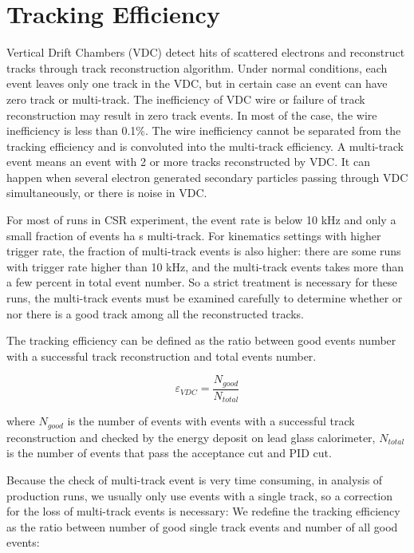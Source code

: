 \section{Tracking Efficiency}

Vertical Drift Chambers (VDC) detect hits of scattered electrons and reconstruct tracks through track
reconstruction algorithm.
Under normal conditions, each event leaves only one track in the VDC, but in certain case an event
can have zero track or multi-track.
The inefficiency of VDC wire or failure of track reconstruction may result in zero track events.
In most of the case, the wire inefficiency is less than 0.1\%.
The wire inefficiency cannot be separated from the tracking efficiency and is convoluted into 
the multi-track efficiency.
A multi-track event means an event  with 2 or more tracks reconstructed by VDC.
It can happen when several electron generated secondary particles passing through VDC simultaneously,
or there is noise in VDC.

For most of runs in CSR experiment, the event rate is below 10 kHz and only a small fraction of events ha
s multi-track. For kinematics settings with higher trigger rate, the fraction of multi-track events is also
higher: there are some runs with trigger rate higher than 10 kHz, and the multi-track events
takes more than a few percent in total event number. So a strict treatment is necessary for these runs,
the multi-track events must be examined carefully to determine whether or nor there is a good track among all
the reconstructed tracks.

The tracking efficiency can be defined as the ratio between good events number with a successful track reconstruction
and total events number.

\begin{equation}
\varepsilon_{VDC} = \frac{N_{good}}{N_{total}}
\end{equation}

where $N_{good}$ is the number of events with events with a successful track reconstruction and checked
by the energy deposit on lead glass calorimeter, $N_{total}$ is the number of events that pass the acceptance
cut and PID cut.

Because the check of multi-track event is very time consuming, in analysis of production runs, we usually only
use events with a single track, so a correction for the loss of multi-track events is necessary:
We redefine the tracking efficiency as the ratio between number of good single track events and number of all
good events: 


